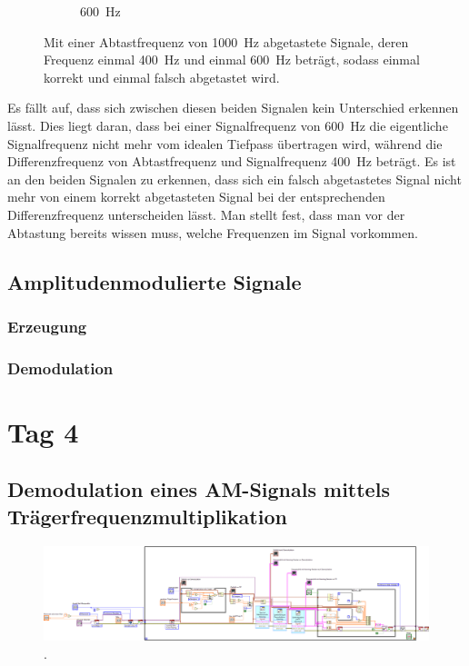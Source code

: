 \documentclass[
a4paper,
12pt,
pagesize,
ngerman
]{scrartcl}
\begin{document}
\begin{figure}[H]
\begin{subfigure}[t]{0.5\textwidth}
			\caption{\SI{600}{\hertz}}
		\end{subfigure}
		\label{fig_ali}
		\caption{Mit einer Abtastfrequenz von \SI{1000}{\hertz} abgetastete Signale, deren Frequenz einmal \SI{400}{\hertz} und einmal \SI{600}{\hertz} beträgt, sodass einmal korrekt und einmal falsch abgetastet wird.}
		\centering
	\end{figure}
	
	Es fällt auf, dass sich zwischen diesen beiden Signalen kein Unterschied erkennen lässt.
	Dies liegt daran, dass bei einer Signalfrequenz von \SI{600}{\hertz} die eigentliche Signalfrequenz nicht mehr vom idealen Tiefpass übertragen wird, während die Differenzfrequenz von Abtastfrequenz und Signalfrequenz \SI{400}{\hertz} beträgt.
	Es ist an den beiden Signalen zu erkennen, dass sich ein falsch abgetastetes Signal nicht mehr von einem korrekt abgetasteten Signal bei der entsprechenden Differenzfrequenz unterscheiden lässt.
	Man stellt fest, dass man vor der Abtastung bereits wissen muss, welche Frequenzen im Signal vorkommen. 
	
	
	\subsection{Amplitudenmodulierte Signale} %
	
	\subsubsection{Erzeugung} %
	
	\subsubsection{Demodulation}
	
	\section{Tag 4}
	
	\subsection{Demodulation eines AM-Signals mittels Trägerfrequenzmultiplikation}
	
	\begin{figure}[h]
		\centering
		\includegraphics[width=1.0\textwidth]{EIRE2018Dateien/Tag4/traegerMultOszi/Oszilloskop__modifiziertd}
		\caption{.}
	\end{figure}
\end{document}
